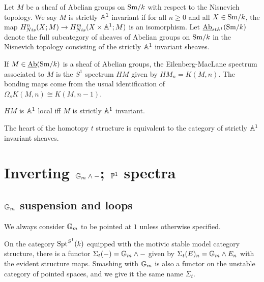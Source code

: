 \documentclass{amsart}%
\begin{document}
\begin{definition}
  Let $M$ be a sheaf of Abelian groups on $\mathrm{Sm}/k$ with respect to the
  Nisnevich topology. We say $M$ is strictly $\mathbb{A}^1$ invariant if for
  all $n\geq 0$ and all $X \in \mathrm{Sm}/k$, the map
  $H^n_{Nis}(X; M) \to H^m_{Nis}(X\times \mathbb{A}^1; M)$ is an
  isomorphism. Let $\operatorname{\underline{Ab}}_{st\mathbb{A}^1}(\mathrm{Sm}/k)$ denote the full subcategory
  of sheaves of Abelian groups on $\mathrm{Sm}/k$ in the Nisnevich topology
  consisting of the strictly $\mathbb{A}^1$ invariant sheaves.
\end{definition}

\begin{definition}
  If $M\in\operatorname{\underline{Ab}}(\mathrm{Sm}/k)$ is a sheaf of Abelian groups, the
  Eilenberg-MacLane spectrum associated to $M$ is the $S^1$ spectrum
  $HM$ given by $HM_n = K(M,n)$. The bonding maps come from the usual
  identification of $\Omega_s K(M,n) \cong K(M,n-1)$. 
\end{definition}

\begin{proposition}
  $HM$ is $\mathbb{A}^1$ local iff $M$ is strictly $\mathbb{A}^1$ invariant.
\end{proposition}

\begin{proposition}
  The heart of the homotopy $t$ structure is equivalent to the
  category of strictly $\mathbb{A}^1$ invariant sheaves.
\end{proposition}

\section{Inverting $\mathbb{G}_m\wedge -$; $\mathbb{P}^1$ spectra}

\subsection{$\mathbb{G}_m$ suspension and loops}

We always consider $\mathbb{G}_m$ to be pointed at $1$ unless otherwise
specified.

\begin{definition}
  On the category $\mathrm{Spt}^{S^1}(k)$ equipped with the motivic stable model
  category structure, there is a functor
  $\Sigma_t(-) = \mathbb{G}_m \wedge -$ given by
  $\Sigma_t(E)_n = \mathbb{G}_m \wedge E_n$ with the evident structure maps.
  Smashing with $\mathbb{G}_m$ is also a functor on the unstable category of
  pointed spaces, and we give it the same name $\Sigma_t$.
\end{definition}
\end{document}
